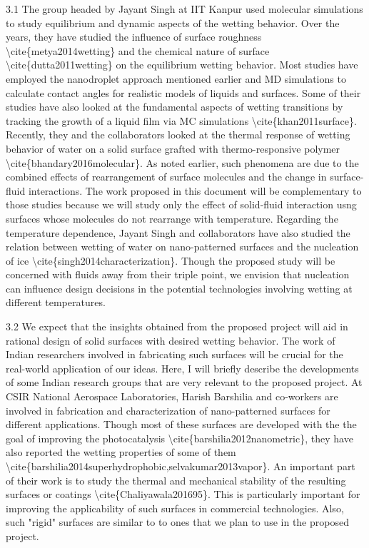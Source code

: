 \par 3.1 The group headed by Jayant Singh at IIT Kanpur used molecular simulations to study equilibrium and dynamic aspects of the wetting behavior. Over the years, they have studied the influence of surface roughness \textbackslash cite\{metya2014wetting\} and the chemical nature of surface \textbackslash cite\{dutta2011wetting\} on the equilibrium wetting behavior. Most studies have employed the nanodroplet approach mentioned earlier and MD simulations to calculate contact angles for realistic models of liquids and surfaces. Some of their studies have also looked at the fundamental aspects of wetting transitions by tracking the growth of a liquid film via MC simulations \textbackslash cite\{khan2011surface\}. Recently, they and the collaborators looked at the thermal response of wetting behavior of water on a solid surface grafted with thermo-responsive polymer \textbackslash cite\{bhandary2016molecular\}. As noted earlier, such phenomena are due to the combined effects of rearrangement of surface molecules and the change in surface-fluid interactions. The work proposed in this document will be complementary to those studies because we will study only the effect of solid-fluid interaction usng surfaces whose molecules do not rearrange with temperature. Regarding the temperature dependence, Jayant Singh and collaborators have also studied the relation between wetting of water on nano-patterned surfaces and the nucleation of ice \textbackslash cite\{singh2014characterization\}. Though the proposed study will be concerned with fluids away from their triple point, we envision that nucleation can influence design decisions in the potential technologies involving wetting at different temperatures.
\par 3.2 We expect that the insights obtained from the proposed project will aid in rational design of solid surfaces with desired wetting behavior. The work of Indian researchers involved in fabricating such surfaces will be crucial for the real-world application of our ideas. Here, I will briefly describe the developments of some Indian research groups that are very relevant to the proposed project. At CSIR National Aerospace Laboratories, Harish Barshilia and co-workers are involved in fabrication and characterization of nano-patterned surfaces for different applications. Though most of these surfaces are developed with the the goal of improving the photocatalysis \textbackslash cite\{barshilia2012nanometric\}, they have also reported the wetting properties of some of them \textbackslash cite\{barshilia2014superhydrophobic,selvakumar2013vapor\}. An important part of their work is to study the thermal and mechanical stability of the resulting surfaces or coatings \textbackslash cite\{Chaliyawala201695\}. This is particularly important for improving the applicability of such surfaces in commercial technologies. Also, such "rigid" surfaces are similar to to ones that we plan to use in the proposed project.
